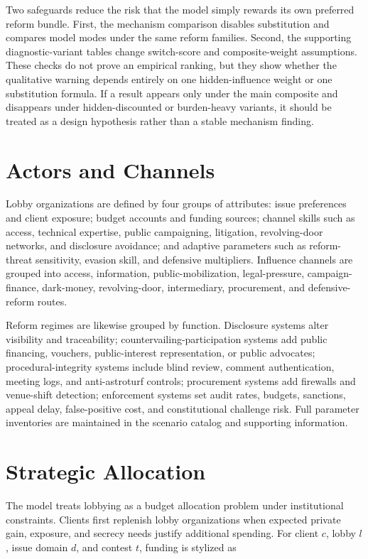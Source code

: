 Two safeguards reduce the risk that the model simply rewards its own preferred reform bundle. First, the mechanism comparison disables substitution and compares model modes under the same reform families. Second, the supporting diagnostic-variant tables change switch-score and composite-weight assumptions. These checks do not prove an empirical ranking, but they show whether the qualitative warning depends entirely on one hidden-influence weight or one substitution formula. If a result appears only under the main composite and disappears under hidden-discounted or burden-heavy variants, it should be treated as a design hypothesis rather than a stable mechanism finding.

\section{Actors and Channels}

Lobby organizations are defined by four groups of attributes: issue preferences and client exposure; budget accounts and funding sources; channel skills such as access, technical expertise, public campaigning, litigation, revolving-door networks, and disclosure avoidance; and adaptive parameters such as reform-threat sensitivity, evasion skill, and defensive multipliers. Influence channels are grouped into access, information, public-mobilization, legal-pressure, campaign-finance, dark-money, revolving-door, intermediary, procurement, and defensive-reform routes.

Reform regimes are likewise grouped by function. Disclosure systems alter visibility and traceability; countervailing-participation systems add public financing, vouchers, public-interest representation, or public advocates; procedural-integrity systems include blind review, comment authentication, meeting logs, and anti-astroturf controls; procurement systems add firewalls and venue-shift detection; enforcement systems set audit rates, budgets, sanctions, appeal delay, false-positive cost, and constitutional challenge risk. Full parameter inventories are maintained in the scenario catalog and supporting information.

\section{Strategic Allocation}

The model treats lobbying as a budget allocation problem under institutional constraints. Clients first replenish lobby organizations when expected private gain, exposure, and secrecy needs justify additional spending. For client \(c\), lobby \(l\), issue domain \(d\), and contest \(t\), funding is stylized as

